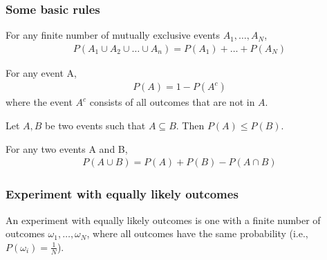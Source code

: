 \begin{frame}
    \frametitle{Some basic rules}

    \scriptsize
    \begin{probRule}
        For any finite number of mutually exclusive events $A_1,\ldots,A_N$,
        \begin{align*}
            P(A_1\cup A_2\cup\ldots\cup A_n) = P(A_1) + \ldots + P(A_N)
        \end{align*}
    \end{probRule}

    \begin{probRule}
        For any event A,
        \begin{align*}
            P(A) = 1 - P(A^c)
        \end{align*}
        where the event $A^c$ consists of all outcomes that are not in $A$.
    \end{probRule}

    \begin{probRule}
		Let $A,B$ be two events such that $A\subseteq B$. Then $P(A)\le P(B)$.
    \end{probRule}

    \begin{probRule}
        For any two events A and B,
        \begin{align*}
            P(A\cup B) = P(A) + P(B) - P(A\cap B)
        \end{align*}
    \end{probRule}

    \normalsize
\end{frame}

\begin{frame}
    \frametitle{Experiment with equally likely outcomes}

    An experiment with equally likely outcomes is one with a finite number of
    outcomes $\omega_1,\ldots,\omega_N$, where all outcomes have the same
    probability (i.e., $P(\omega_i)=\frac{1}{N}$).



\end{frame}

